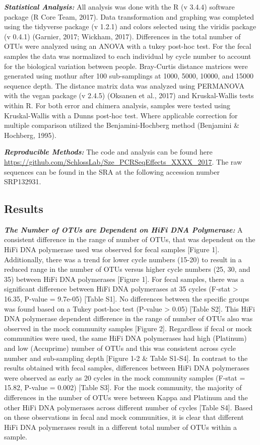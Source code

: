 \documentclass[12pt,]{article}
\begin{document}
\textbf{\emph{Statistical Analysis:}} All analysis was done with the R
(v 3.4.4) software package (R Core Team, 2017). Data transformation and
graphing was completed using the tidyverse package (v 1.2.1) and colors
selected using the viridis package (v 0.4.1) (Garnier, 2017; Wickham,
2017). Differences in the total number of OTUs were analyzed using an
ANOVA with a tukey post-hoc test. For the fecal samples the data was
normalized to each individual by cycle number to account for the
biological variation between people. Bray-Curtis distance matrices were
generated using mothur after 100 sub-samplings at 1000, 5000, 10000, and
15000 sequence depth. The distance matrix data was analyzed using
PERMANOVA with the vegan package (v 2.4.5) (Oksanen et al., 2017) and
Kruskal-Wallis tests within R. For both error and chimera analysis,
samples were tested using Kruskal-Wallis with a Dunns post-hoc test.
Where applicable correction for multiple comparison utilized the
Benjamini-Hochberg method (Benjamini \& Hochberg, 1995).

\textbf{\emph{Reproducible Methods:}} The code and analysis can be found
here \url{https://github.com/SchlossLab/Sze_PCRSeqEffects_XXXX_2017}.
The raw sequences can be found in the SRA at the following accession
number SRP132931.

\newpage

\subsection{Results}\label{results}

\textbf{\emph{The Number of OTUs are Dependent on HiFi DNA Polymerase:}}
A consistent difference in the range of number of OTUs, that was
dependent on the HiFi DNA polymerase used was observed for fecal samples
{[}Figure 1{]}. Additionally, there was a trend for lower cycle numbers
(15-20) to result in a reduced range in the number of OTUs versus higher
cycle numbers (25, 30, and 35) between HiFi DNA polymerases {[}Figure
1{]}. For fecal samples, there was a significant difference between HiFi
DNA polymerases at 35 cycles (F-stat \textgreater{} 16.35, P-value =
9.7e-05) {[}Table S1{]}. No differences between the specific groups was
found based on a Tukey post-hoc test (P-value \textgreater{} 0.05)
{[}Table S2{]}. This HiFi DNA polymerase dependent difference in the
range of number of OTUs also was observed in the mock community samples
{[}Figure 2{]}. Regardless if fecal or mock communities were used, the
same HiFi DNA polymerases had high (Platinum) and low (Accuprime) number
of OTUs and this was consistent across cycle number and sub-sampling
depth {[}Figure 1-2 \& Table S1-S4{]}. In contrast to the results
obtained with fecal samples, differences between HiFi DNA polymerases
were observed as early as 20 cycles in the mock community samples
(F-stat = 15.82, P-value = 0.002) {[}Table S3{]}. For the mock
community, the majority of differences in the number of OTUs were
between Kappa and Platinum and the other HiFi DNA polymerases across
different number of cycles {[}Table S4{]}. Based on these observations
in fecal and mock communities, it is clear that different HiFi DNA
polymerases result in a different total number of OTUs within a sample.
\end{document}
